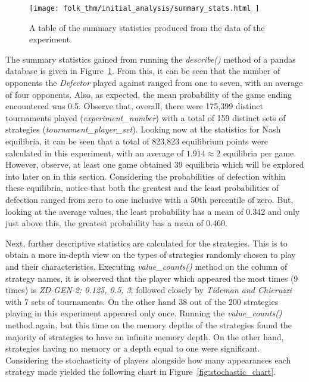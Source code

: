 \begin{figure}
    \centering
    \texttt{[image: folk\_thm/initial\_analysis/summary\_stats.html
    ]}
    \caption{A table of the summary statistics produced from the data of the experiment.}\label{fig:summary_stats}
\end{figure}

The summary statistics gained from running the \textit{describe()} method of a
pandas database is given in Figure~\ref{fig:summary_stats}. From this, it can be
seen that the number of opponents the \textit{Defector} played against ranged
from one to seven, with an average of four opponents. Also, as expected, the
mean probability of the game ending encountered was 0.5. Observe that, overall,
there were 175,399 distinct tournaments played (\textit{experiment_number}) with
a total of 159 distinct sets of strategies (\textit{tournament_player_set}).
Looking now at the statistics for Nash equilibria, it can be seen that a total
of 823,823 equilibrium points were calculated in this experiment, with an
average of \(1.914 \approx 2\) equilibria per game. However, observe, at least
one game obtained 39 equilibria which will be explored into later on in this
section. Considering the probabilities of defection within these equilibria,
notice that both the greatest and the least probabilities of defection ranged
from zero to one inclusive with a \(50\)th percentile of zero. But, looking at
the average values, the least probability has a mean of 0.342 and only just
above this, the greatest probability has a mean of 0.460.

Next, further descriptive statistics are calculated for the strategies. This is
to obtain a more in-depth view on the types of strategies randomly chosen to
play and their characteristics. Executing \textit{value_counts()} method on the
column of strategy names, it is observed that the player which appeared the most
times (9 times) is \textit{ZD-GEN-2: 0.125, 0.5, 3}; followed closely by
\textit{Tideman and Chieruzzi} with 7 sets of tournaments. On the other hand 38
out of the 200 strategies playing in this experiment appeared only once.
Running the \textit{value_counts()} method again, but this time on the memory
depths of the strategies found the majority of strategies to have an infinite
memory depth. On the other hand, strategies having no memory or a depth equal to
one were significant. Considering the stochasticity of players alongside how
many appearances each strategy made yielded the following chart in
Figure~\ref{fig:stochastic_chart}.

